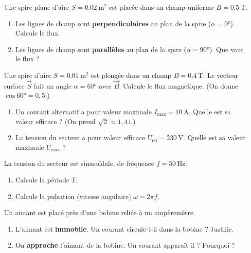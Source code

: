 \documentclass[11pt,a4paper]{article}
\newcommand{\vv}[1]{\vec{#1}}\newcommand{\ds}{\displaystyle}
\begin{document}
\begin{exo}
Une spire plane d'aire $S=\qty{0.02}{\metre\squared}$ est placée dans un champ uniforme
$B=\qty{0.5}{\tesla}$.
\begin{enumerate}[label=\alph*)]
  \item Les lignes de champ sont \textbf{perpendiculaires} au plan de la spire ($\alpha=\ang{0}$).
        Calcule le flux.
  \item Les lignes de champ sont \textbf{parallèles} au plan de la spire ($\alpha=\ang{90}$). Que vaut
        le flux ?
\end{enumerate}
\end{exo}

\begin{exo}
Une spire d'aire $S=\qty{0.01}{\metre\squared}$ est plongée dans un champ $B=\qty{0.4}{\tesla}$.
Le vecteur surface $\vv{S}$ fait un angle $\alpha=\ang{60}$ avec $\vv{B}$. Calcule le flux magnétique.
(On donne $\cos\ang{60}=0{,}5$.)
\end{exo}

\begin{exo}
\begin{enumerate}[label=\alph*)]
  \item Un courant alternatif a pour valeur maximale $I_{\max}=\qty{10}{\ampere}$. Quelle est sa
        valeur efficace ? (On prend $\sqrt2\approx1{,}41$.)
  \item La tension du secteur a pour valeur efficace $U_{\text{eff}}=\qty{230}{\volt}$. Quelle est sa
        valeur maximale $U_{\max}$ ?
\end{enumerate}
\end{exo}

\begin{exo}
La tension du secteur est sinusoïdale, de fréquence $f=\qty{50}{\hertz}$.
\begin{enumerate}[label=\alph*)]
  \item Calcule la période $T$.
  \item Calcule la pulsation (vitesse angulaire) $\omega=2\pi f$.
\end{enumerate}
\end{exo}

\begin{exo}
Un aimant est placé près d'une bobine reliée à un ampèremètre.
\begin{enumerate}[label=\alph*)]
  \item L'aimant est \textbf{immobile}. Un courant circule-t-il dans la bobine ? Justifie.
  \item On \textbf{approche} l'aimant de la bobine. Un courant apparaît-il ? Pourquoi ?
\end{enumerate}
\end{exo}
\end{document}
